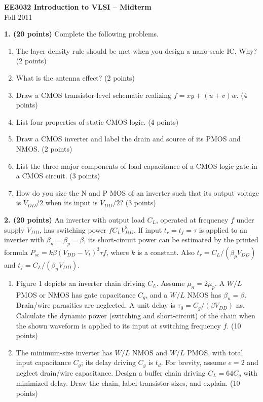 \documentclass[10pt]{article}
\begin{document}
\begin{center}{\large\bfseries EE3032 Introduction to VLSI -- Midterm}\\Fall 2011\end{center}
\textbf{1. (20 points)} Complete the following problems.
\begin{enumerate}[label=(\alph*),leftmargin=7mm,itemsep=2pt]
\item The layer density rule should be met when you design a nano-scale IC. Why? (2 points)
\item What is the antenna effect? (2 points)
\item Draw a CMOS transistor-level schematic realizing $f=\overline{xy+(u+v)w}$. (4 points)
\item List four properties of static CMOS logic. (4 points)
\item Draw a CMOS inverter and label the drain and source of its PMOS and NMOS. (2 points)
\item List the three major components of load capacitance of a CMOS logic gate in a CMOS circuit. (3 points)
\item How do you size the N and P MOS of an inverter such that its output voltage is $V_{DD}/2$ when its input is $V_{DD}/2$? (3 points)
\end{enumerate}
\textbf{2. (20 points)} An inverter with output load $C_L$, operated at frequency $f$ under supply $V_{DD}$, has switching power $fC_LV_{DD}^2$. If input $t_r=t_f=\tau$ is applied to an inverter with $\beta_n=\beta_p=\beta$, its short-circuit power can be estimated by the printed formula $P_{sc}=k\beta(V_{DD}-V_t)^3\tau f$, where $k$ is a constant. Also $t_r=C_L/(\beta_pV_{DD})$ and $t_f=C_L/(\beta_nV_{DD})$.
\begin{enumerate}[label=(\alph*),leftmargin=7mm]
\item Figure 1 depicts an inverter chain driving $C_L$. Assume $\mu_n=2\mu_p$. A $W/L$ PMOS or NMOS has gate capacitance $C_g$, and a $W/L$ NMOS has $\beta_n=\beta$. Drain/wire parasitics are neglected. A unit delay is $\tau_0=C_g/(\beta V_{DD})$ ns. Calculate the dynamic power (switching and short-circuit) of the chain when the shown waveform is applied to its input at switching frequency $f$. (10 points)
\item The minimum-size inverter has $W/L$ NMOS and $W/L$ PMOS, with total input capacitance $C_g$; its delay driving $C_g$ is $t_d$. For brevity, assume $e=2$ and neglect drain/wire capacitance. Design a buffer chain driving $C_L=64C_g$ with minimized delay. Draw the chain, label transistor sizes, and explain. (10 points)
\end{enumerate}
\end{document}
